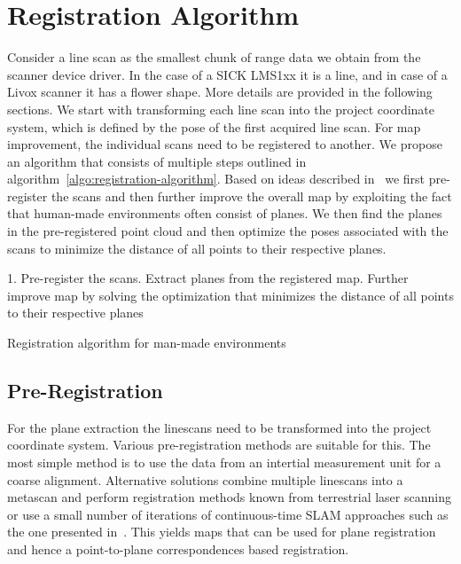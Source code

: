 \section{Registration Algorithm}

Consider a line scan as the smallest chunk of range data we obtain from the scanner device driver.
In the case of a SICK LMS1xx it is a line, and in case of a Livox scanner it has a flower shape.
More details are provided in the following sections.
We start with transforming each line scan into the project coordinate system, which is defined by the pose of the first acquired line scan.
%
For map improvement, the individual scans need to be registered to another. 
We propose an algorithm that consists of multiple steps outlined in algorithm~\ref{algo:registration-algorithm}. 
Based on ideas described in~\cite{Borrmann2010} we first pre-register the scans and then further improve the overall map by exploiting the fact that human-made environments often consist of planes. 
We then find the planes in the pre-registered point cloud and then optimize the poses associated with the scans to minimize the distance of all points to their respective planes. 

\begin{algorithm}
    \SetAlgoLined
    1. Pre-register the scans. Extract planes from the registered map. Further improve map by solving the optimization that minimizes the distance of all points to their respective planes\;
    \caption{Registration algorithm for man-made environments}
    \label{algo:registration-algorithm}
\end{algorithm}

\subsection{Pre-Registration}

For the plane extraction the linescans need to be transformed into the project coordinate system.
Various pre-registration methods are suitable for this.
The most simple method is to use the data from an intertial measurement unit for a coarse alignment.
Alternative solutions combine multiple linescans into a metascan and perform registration methods known from terrestrial laser scanning or use a small number of iterations of continuous-time SLAM approaches such as the one presented in~\cite{REMSEN2013}.
This yields maps that can be used for plane registration and hence a point-to-plane correspondences based registration.

